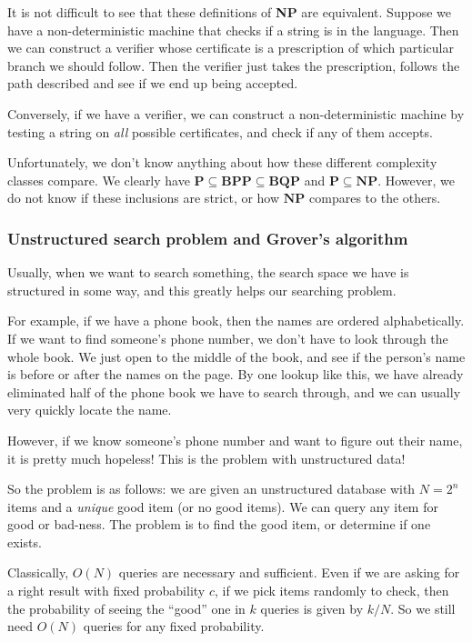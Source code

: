 \documentclass[a4paper]{article}
\begin{document}
It is not difficult to see that these definitions of \textbf{NP} are equivalent. Suppose we have a non-deterministic machine that checks if a string is in the language. Then we can construct a verifier whose certificate is a prescription of which particular branch we should follow. Then the verifier just takes the prescription, follows the path described and see if we end up being accepted.

Conversely, if we have a verifier, we can construct a non-deterministic machine by testing a string on \emph{all} possible certificates, and check if any of them accepts.

Unfortunately, we don't know anything about how these different complexity classes compare. We clearly have $\mathbf{P} \subseteq \mathbf{BPP} \subseteq \mathbf{BQP}$ and $\mathbf{P} \subseteq \mathbf{NP}$. However, we do not know if these inclusions are strict, or how $\mathbf{NP}$ compares to the others.

\subsubsection*{Unstructured search problem and Grover's algorithm}
Usually, when we want to search something, the search space we have is structured in some way, and this greatly helps our searching problem.

For example, if we have a phone book, then the names are ordered alphabetically. If we want to find someone's phone number, we don't have to look through the whole book. We just open to the middle of the book, and see if the person's name is before or after the names on the page. By one lookup like this, we have already eliminated half of the phone book we have to search through, and we can usually very quickly locate the name.

However, if we know someone's phone number and want to figure out their name, it is pretty much hopeless! This is the problem with unstructured data!

So the problem is as follows: we are given an unstructured database with $N = 2^n$ items and a \emph{unique} good item (or no good items). We can query any item for good or bad-ness. The problem is to find the good item, or determine if one exists.

Classically, $O(N)$ queries are necessary and sufficient. Even if we are asking for a right result with fixed probability $c$, if we pick items randomly to check, then the probability of seeing the ``good'' one in $k$ queries is given by $k/N$. So we still need $O(N)$ queries for any fixed probability.
\end{document}

